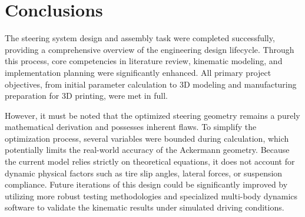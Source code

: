 \section{Conclusions}

The steering system design and assembly task were completed successfully, providing a comprehensive overview of the engineering design lifecycle. Through this process, core competencies in literature review, kinematic modeling, and implementation planning were significantly enhanced. All primary project objectives, from initial parameter calculation to 3D modeling and manufacturing preparation for 3D printing, were met in full.

\vspace{0.5cm}

However, it must be noted that the optimized steering geometry remains a purely mathematical derivation and possesses inherent flaws. To simplify the optimization process, several variables were bounded during calculation, which potentially limits the real-world accuracy of the Ackermann geometry. Because the current model relies strictly on theoretical equations, it does not account for dynamic physical factors such as tire slip angles, lateral forces, or suspension compliance. Future iterations of this design could be significantly improved by utilizing more robust testing methodologies and specialized multi-body dynamics software to validate the kinematic results under simulated driving conditions.